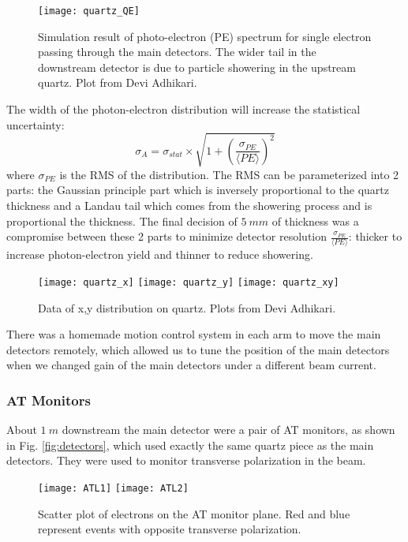 \begin{figure}
    \centering
    \texttt{[image: quartz\_QE]}
    \caption{Simulation result of photo-electron (PE) spectrum for single electron
    passing through the main detectors. The wider tail in the downstream
    detector is due to particle showering in the upstream quartz.
    Plot from Devi Adhikari.}
\end{figure}
The width of the photon-electron distribution will increase
the statistical uncertainty:
\begin{equation}
    \sigma_{A} = \sigma_{stat} \times \sqrt{1 + \left( \frac{\sigma_{PE}}{\langle PE \rangle }\right)^2}
\end{equation}
where $\sigma_{PE}$ is the RMS of the distribution. The RMS can be parameterized
into 2 parts: the Gaussian principle part which is inversely proportional to
the quartz thickness and a Landau tail which comes from the showering process
and is proportional the thickness. The final decision of $5\ mm$ of thickness
was a compromise between these 2 parts to minimize detector resolution 
$\frac{\sigma_{PE}}{\langle PE \rangle}$: thicker to increase photon-electron
yield and thinner to reduce showering.

\begin{figure}
    \centering
    \texttt{[image: quartz\_x]}
    \texttt{[image: quartz\_y]}
    \texttt{[image: quartz\_xy]}
    \caption{Data of x,y distribution on quartz. Plots from Devi Adhikari.}
\end{figure}

There was a homemade motion control system in each arm to move the main detectors
remotely, which allowed us to tune the position of the main detectors when we
changed gain of the main detectors under a different beam current.


\subsubsection{AT Monitors}
About $1\ m$ downstream the main detector were a pair of AT monitors, as shown 
in Fig. \ref{fig:detectors}, which used exactly the same quartz piece as the 
main detectors. They were used to monitor transverse polarization in the beam.
\begin{figure}[h!]
    \centering
    \texttt{[image: ATL1]}
    \texttt{[image: ATL2]}
    \caption{Scatter plot of electrons on the AT monitor plane. Red and blue represent
    events with opposite transverse polarization. 
    }
\end{figure}

